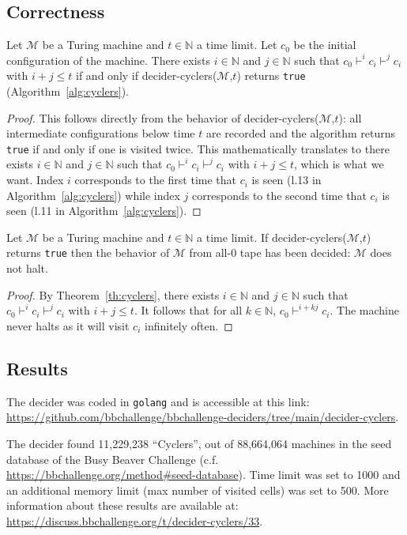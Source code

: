 \subsection{Correctness}



\begin{theorem}\label{th:cyclers} Let $\mathcal{M}$ be a Turing machine and $t \in \mathbb{N}$ a time limit. Let $c_0$ be the initial configuration of the machine. There exists $i\in\mathbb{N}$ and $j\in\mathbb{N}$ such that $c_0 \vdash^i c_i \vdash^j c_i$ with $i+j \leq t$ if and only if {\sc decider-cyclers}($\mathcal{M}$,$t$) returns \texttt{true} (Algorithm~\ref{alg:cyclers}).
\end{theorem}
\begin{proof}
  This follows directly from the behavior of {\sc decider-cyclers}($\mathcal{M}$,$t$): all intermediate configurations below time $t$ are recorded and the algorithm returns \texttt{true} if and only if one is visited twice. This mathematically translates to
  there exists $i\in\mathbb{N}$ and $j\in\mathbb{N}$ such that $c_0 \vdash^i c_i \vdash^j c_i$ with $i+j \leq t$, which is what we want. Index $i$ corresponds to the first time that $c_i$ is seen (l.13 in Algorithm~\ref{alg:cyclers}) while index $j$ corresponds to the second time that $c_i$ is seen (l.11 in Algorithm~\ref{alg:cyclers}).
\end{proof}

\begin{corollary}
  Let $\mathcal{M}$ be a Turing machine and $t \in \mathbb{N}$ a time limit. If {\sc decider-cyclers}($\mathcal{M}$,$t$) returns \texttt{true} then the behavior of $\mathcal{M}$ from all-0 tape has been decided: $\mathcal{M}$ does not halt.
\end{corollary}
\begin{proof}
  By Theorem~\ref{th:cyclers}, there exists $i\in\mathbb{N}$ and $j\in\mathbb{N}$ such that $c_0 \vdash^i c_i \vdash^j c_i$ with $i+j \leq t$. It follows that for all $k\in\mathbb{N}$, $c_0 \vdash^{i+kj} c_i$. The machine never halts as it will visit $c_i$ infinitely often.
\end{proof}

\subsection{Results}

The decider was coded in \texttt{golang} and is accessible at this link: \url{https://github.com/bbchallenge/bbchallenge-deciders/tree/main/decider-cyclers}.

The decider found 11,229,238 ``Cyclers'', out of 88,664,064 machines in the seed database of the Busy Beaver Challenge (c.f. \url{https://bbchallenge.org/method#seed-database}). Time limit was set to 1000 and an additional memory limit (max number of visited cells) was set to 500. More information about these results are available at: \url{https://discuss.bbchallenge.org/t/decider-cyclers/33}.
